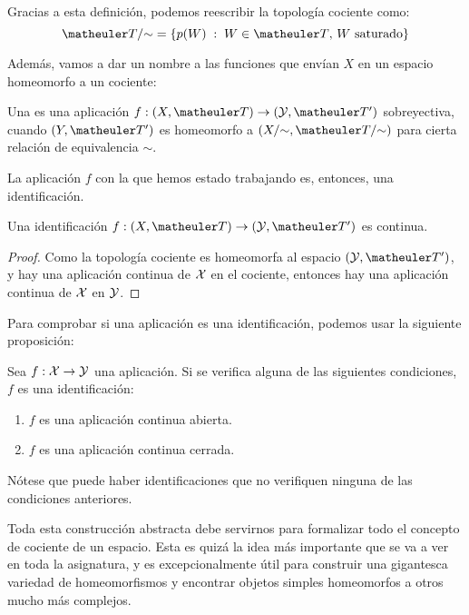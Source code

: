 Gracias a esta definición, podemos reescribir la topología cociente como:
\[\T/\mathord{\sim} = \{p(W)\midc W\in\T\text{, } W\text{ saturado}\}\]

Además, vamos a dar un nombre a las funciones que envían $X$ en un espacio homeomorfo a un cociente:

\begin{defi}[Identificación]
	Una  es una aplicación $f:(X,\T)\to (\mc{Y},\T')$ sobreyectiva, cuando $(Y,\T')$ es homeomorfo a $(X/\mathord{\sim},\T/\mathord{\sim})$ para cierta relación de equivalencia $\mathord{\sim}$.
\end{defi}

La aplicación $f$ con la que hemos estado trabajando es, entonces, una identificación. 

\begin{prop}
	Una identificación $f:(X,\T)\to (\mc{Y},\T')$ es continua.
	
	\begin{proof}
		Como la topología cociente es homeomorfa al espacio $(\mc{Y},\T')$, y hay una aplicación continua de $\mathcal{X}$ en el cociente, entonces hay una aplicación continua de $\mathcal{X}$ en $\mathcal{Y}$.
	\end{proof}
\end{prop}

Para comprobar si una aplicación es una identificación, podemos usar la siguiente proposición:

\begin{prop}
Sea $f:\mathcal{X}\to\mathcal{Y}$ una aplicación. Si se verifica alguna de las siguientes condiciones, $f$ es una identificación:
\begin{enumerate}
\item $f$ es una aplicación continua abierta.
\item $f$ es una aplicación continua cerrada.
\end{enumerate}
\end{prop}

Nótese que puede haber identificaciones que no verifiquen ninguna de las condiciones anteriores.

Toda esta construcción abstracta debe servirnos para formalizar todo el concepto de cociente de un espacio. Esta es quizá la idea más importante que se va a ver en toda la asignatura, y es excepcionalmente útil para construir una gigantesca variedad de homeomorfismos y encontrar objetos simples homeomorfos a otros mucho más complejos.